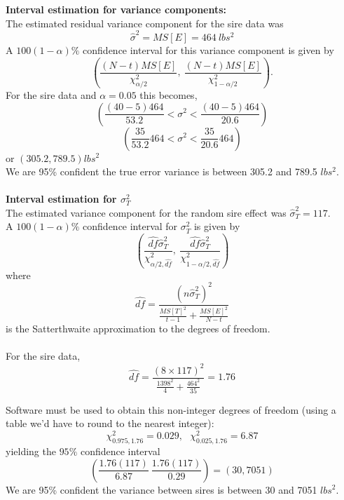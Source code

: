 \textbf{Interval estimation for variance components:}\\
The estimated residual variance component for the sire data was
$$\hat\sigma^2 = MS[E] = 464~lbs^2$$ 
A $100(1-\alpha)\%$ confidence interval for this variance component is given by 
$$ \left(\frac{(N-t)MS[E]}{\chi^2_{\alpha/2}}, \ \frac{(N-t)MS[E]}{\chi^2_{1-\alpha/2}}\right).$$ 
For the sire data and $\alpha=0.05$ this becomes,
$$\left(\frac{(40-5)464}{53.2} < \sigma^2 < \frac{(40-5)464}{20.6}\right) $$
$$\left(\frac{35}{53.2}464 < \sigma^2 < \frac{35}{20.6}464\right)$$
or $(305.2,789.5) lbs^2$\\
We are 95\% confident the true error variance is between 305.2 and 789.5 $lbs^2$.\\~\\

\textbf{Interval estimation for $\sigma_T^2$}\\
The estimated variance component for the random sire effect was $\hat\sigma_T^2 = 117$.\\
A $100(1-\alpha)\%$ confidence interval for $\sigma^2_T$ is given by 
$$ \left(\frac{\widehat{df}\hat\sigma_T^2}{\chi^2_{\alpha/2,\widehat{df}}}, \ \frac{\widehat{df}\hat\sigma_T^2}{\chi^2_{1-\alpha/2,\widehat{df}}}\right)$$ 
where 
$$\widehat{df} = \frac{(n \hat\sigma_T^2)^2}{\frac{MS[T]^2}{t-1} + \frac{MS[E]^2}{N-t}}$$
is the Satterthwaite approximation to the degrees of freedom.\\~\\
For the sire data,
$$ \widehat{df} = \frac{(8 \times 117)^2}{\frac{1398^2}{4}+\frac{464^2}{35}} = 1.76$$

Software must be used to obtain this non-integer degrees of freedom (using a table we'd have to round to the nearest integer):
$$ \chi^2_{0.975,1.76} = 0.029, \ \ \ \chi^2_{0.025,1.76} = 6.87 $$
yielding the $95\%$ confidence interval
$$ \left(\frac{1.76 (117)}{6.87} \ \frac{1.76 (117)}{0.29} \right)=(30,7051)$$
We are 95\% confident the variance between sires is between 30 and 7051 $lbs^2$.

